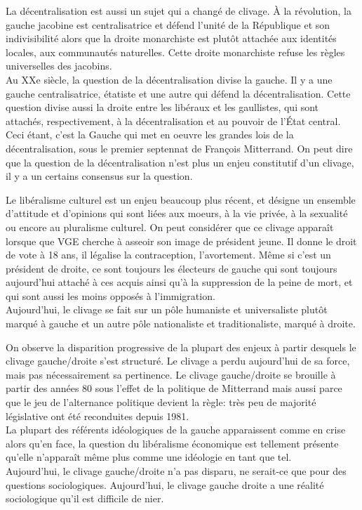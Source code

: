 \documentclass[10pt, a4paper, openany]{book}
\begin{document}
La décentralisation est aussi un sujet qui a changé de clivage. À la révolution, la gauche jacobine est centralisatrice et défend l'unité de la République et son indivisibilité alors que la droite monarchiste est plutôt attachée aux identités locales, aux communautés naturelles. Cette droite monarchiste refuse les règles universelles des jacobins. \\
Au XXe siècle, la question de la décentralisation divise la gauche. Il y a une gauche centralisatrice, étatiste et une autre qui défend la décentralisation. Cette question divise aussi la droite entre les libéraux et les gaullistes, qui sont attachés, respectivement, à la décentralisation et au pouvoir de l'État central. \\
Ceci étant, c'est la Gauche qui met en oeuvre les grandes lois de la décentralisation, sous le premier septennat de François Mitterrand. On peut dire que la question de la décentralisation n'est plus un enjeu constitutif d'un clivage, il y a un certains consensus sur la question. 


Le libéralisme culturel est un enjeu beaucoup plus récent, et désigne un ensemble d'attitude et d'opinions qui sont liées aux moeurs, à la vie privée, à la sexualité ou encore au pluralisme culturel. On peut considérer que ce clivage apparaît lorsque que VGE cherche à asseoir son image de président jeune. Il donne le droit de vote à 18 ans, il légalise la contraception, l'avortement. Même si c'est un président de droite, ce sont toujours les électeurs de gauche qui sont toujours aujourd'hui attaché à ces acquis ainsi qu'à la suppression de la peine de mort, et qui sont aussi les moins opposés à l'immigration. \\
Aujourd'hui, le clivage se fait sur un pôle humaniste et universaliste plutôt marqué à gauche et un autre pôle nationaliste et traditionaliste, marqué à droite. 


On observe la disparition progressive de la plupart des enjeux à partir desquels le clivage gauche/droite s'est structuré. Le clivage a perdu aujourd'hui de sa force, mais pas nécessairement sa pertinence. Le clivage gauche/droite se brouille à partir des années 80 sous l'effet de la politique de Mitterrand mais aussi parce que le jeu de l'alternance politique devient la règle: très peu de majorité législative ont été reconduites depuis 1981. \\
La plupart des référents idéologiques de la gauche apparaissent comme en crise alors qu'en face, la question du libéralisme économique est tellement présente qu'elle n'apparaît même plus comme une idéologie en tant que tel. \\
Aujourd'hui, le clivage gauche/droite n'a pas disparu, ne serait-ce que pour des questions sociologiques. Aujourd'hui, le clivage gauche droite a une réalité sociologique qu'il est difficile de nier. 
\end{document}
